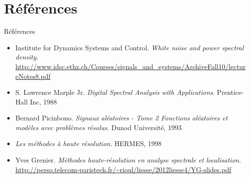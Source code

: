 \documentclass[10pt]{beamer}
\begin{document}
    
    \section {Références}
    \begin{frame}{Références}
    
        \begin{itemize}
        \item 
        Institute for Dynamics Systems and Control. \textit{White noise and power spectral density}.\\
        \url{http://www.idsc.ethz.ch/Courses/signals_and_systems/ArchiveFall10/lectureNotes8.pdf}
        
        \item S. Lawrence Marple Jr. \textit{Digital Spectral Analysis with Applications}. Prentice-Hall Inc, 1988
        
        \item Bernard Picinbono. \textit{Signaux aléatoires - Tome 2 Fonctions aléatoires et modèles avec problèmes résolus}. Dunod Université, 1993
        
        \item \textit{Les méthodes à haute résolution}. HERMES, 1998
        
        \item Yves Grenier. \textit{Méthodes haute-résolution en analyse spectrale et localisation}. \\
\url{http://perso.telecom-paristech.fr/~rioul/liesse/2012liesse4/YG-slides.pdf}
        
        \end{itemize}

    \end{frame}
    
\end{document}
